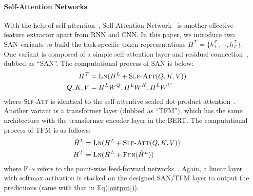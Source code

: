 \documentclass[11pt,a4paper]{article}
\begin{document}
\paragraph{Self-Attention Networks} With the help of self attention~\cite{cheng-etal-2016-long,lin2017structured}, Self-Attention Network~\cite{vaswani2017attention,shen2018disan} is another effective feature extractor apart from RNN and CNN. In this paper, we introduce two SAN variants to build the task-specific token representations $H^{\mathcal{T}}=\{h^{\mathcal{T}}_1,\cdots,h^{\mathcal{T}}_T\}$. One variant is composed of a simple self-attention layer and residual connection~\cite{he2016deep}, dubbed as ``SAN''. The computational process of SAN is below:
\begin{equation}
\begin{split}
    H^{\mathcal{T}} &= \textsc{Ln}(H^{L}+\textsc{Slf-Att} (Q, K, V)) \\
    Q, K, V &=  H^{L} W^{Q}, H^{L}W^{K}, H^{L} W^{V}
\end{split}
\end{equation}
where \textsc{Slf-Att} is identical to the self-attentive scaled dot-product attention~\cite{vaswani2017attention}. Another variant is a transformer layer (dubbed as ``TFM''), which has the same architecture with the transformer encoder layer in the BERT. The computational process of TFM is as follows: 
\begin{equation}
\begin{split}
    \hat{H}^{L} &= \textsc{Ln}(H^{L}+\textsc{Slf-Att} (Q, K, V)) \\
    H^{\mathcal{T}} &= \textsc{Ln}(\hat{H}^{L}+\textsc{Ffn}(\hat{H}^{L}))
\end{split}
\end{equation}
where \textsc{Ffn} refers to the point-wise feed-forward networks~\cite{vaswani2017attention}. Again, a linear layer with softmax activation is stacked on the designed SAN/TFM layer to output the predictions (same with that in Eq(\ref{output})).
\end{document}
